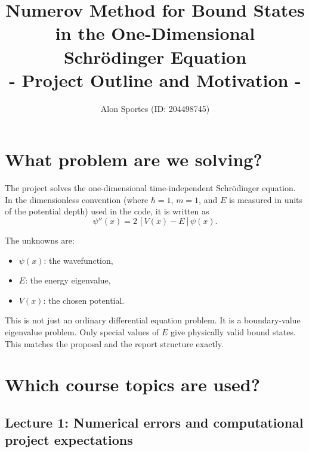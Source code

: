\documentclass[11pt]{article}
\title{\textbf{Numerov Method for Bound States in the One-Dimensional Schr\"odinger Equation}\\ 
       \textbf{- Project Outline and Motivation -}}
\author{Alon Sportes (ID: 204498745)}
\date{}
\begin{document}
    \maketitle

    \vfill

    \begingroup
        \setlength{\parskip}{0pt}
        \tableofcontents
    \endgroup
    \vfill

    \newpage
    \begingroup
        \setlength{\parskip}{0pt}
        \listoffigures
    \endgroup

    \newpage

    \section{What problem are we solving?}

    The project solves the one-dimensional time-independent Schr\"odinger equation. In the dimensionless convention (where $\hbar=1$, $m=1$, and $E$ is measured in units of the potential depth) used in the code, it is written as
    \begin{equation}
        \psi''(x) = 2\,[V(x)-E]\psi(x).
    \end{equation}

    The unknowns are:
    \begin{itemize}
        \item $\psi(x)$: the wavefunction,
        \item $E$: the energy eigenvalue,
        \item $V(x)$: the chosen potential.
    \end{itemize}

    This is not just an ordinary differential equation problem. It is a boundary-value eigenvalue problem. Only special values of $E$ give physically valid bound states. This matches the proposal and the report structure exactly.

    \section{Which course topics are used?}

    \subsection{Lecture 1: Numerical errors and computational project expectations}
\end{document}
